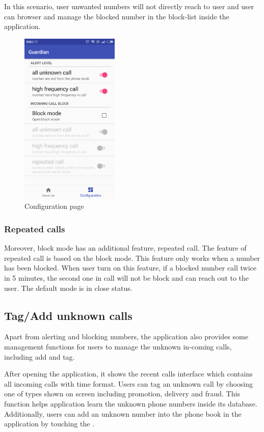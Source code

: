 \documentclass{article}
\begin{document}
    In this scenario, user unwanted numbers will not directly reach to user and user can browser and manage the blocked number in the block-list inside the application.

    \begin{figure}[H]
        \centering
        \includegraphics[width=0.418\textwidth]{images/config.jpg}
        \caption{Configuration page}
        \label{image_config}
    \end{figure}

    \subsubsection{Repeated calls}
    Moreover, block mode has an additional feature, repeated call.
    The feature of repeated call is based on the block mode.
    This feature only works when a number has been blocked.
    When user turn on this feature, if a blocked number call twice in 5 minutes, the second one in call will not be block and can reach out to the user.
    The default mode is in close status.

    \subsection{Tag/Add unknown calls}
    Apart from alerting and blocking numbers, the application also provides some management functions for users to manage the unknown in-coming calls, including add and tag.

    After opening the application, it shows the recent calls interface which contains all incoming calls with time format.
    Users can tag an unknown call by choosing one of types shown on screen including promotion, delivery and fraud.
    This function helps application learn the unknown phone numbers inside its database.
    Additionally, users can add an unknown number into the phone book in the application by touching the .
\end{document}
